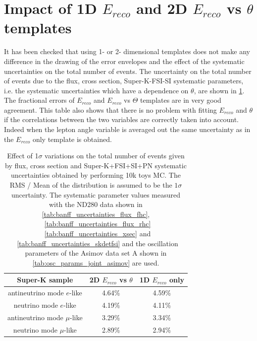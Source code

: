 
%
%

\section{Impact of 1D $E_{reco}$ and 2D $E_{reco}$ vs $\theta$ templates}
\label{app:comp_1d_ereco_2d_ereco_vs_theta}

It has been checked that using 1- or 2- dimensional 
templates does not make any difference in the 
drawing of the error envelopes and the effect of the systematic
uncertainties on the total number of events.
The uncertainty on the total number of events due to the flux, cross section, Super-K-FSI-SI systematic parameters, 
i.e. the systematic uncertainties which have a dependence on $\theta$,
are shown in \cref{tab:syst_diff_2d_1d_templates}.
The fractional errors of $E_{reco}$ and $E_{reco}$ vs $\Theta$ templates are in very good agreement.
This table also shows that there is no problem with fitting $E_{reco}$ and $\theta$ if the correlations between the two variables 
are correctly taken into account. 
Indeed when the lepton angle variable is averaged out the same uncertainty as in the $E_{reco}$ only template is obtained.

\begin{table}
\centering
 \begin{tabular}{| c | c | c |}
 \hline
 Super-K sample                                               	& 2D $E_{reco}$ vs $\theta$	  	& 1D $E_{reco}$ only   \\
\hline
antineutrino mode $e$-like                                	& 4.64\%						& 4.59\%   \\
neutrino mode $e$-like                                       & 4.19\%						& 4.11\%   \\
antineutrino mode $\mu$-like                             & 3.29\%     					& 3.34\%     \\
neutrino mode $\mu$-like                            	& 2.89\%		    				& 2.94\%     \\
\hline
\end{tabular}
\caption{
Effect of 1$\sigma$ variations on the total number of events given by flux, cross section and Super-K+FSI+SI+PN systematic uncertainties
obtained by performing 10k toys MC.
The RMS / Mean of the distribution is assumed to be the $1\sigma$ uncertainty.
The systematic parameter values measured with the ND280 data 
shown in 
\cref{tab:banff_uncertainties_flux_fhc},
~\ref{tab:banff_uncertainties_flux_rhc}
~\ref{tab:banff_uncertainties_xsec}
and
~\ref{tab:banff_uncertainties_skdetfsi}
and the oscillation parameters of the Asimov data set A shown in \cref{tab:osc_params_joint_asimov}
are used.
}
\label{tab:syst_diff_2d_1d_templates}
\end{table}


